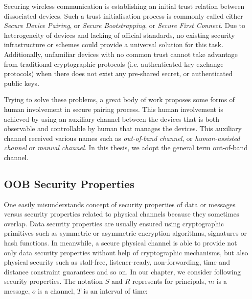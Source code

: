 Securing wireless communication is establishing an initial trust relation between dissociated devices. Such a trust initialisation process is commonly called either \textit{Secure Device Pairing}, or \textit{Secure Bootstrapping}, or \textit{Secure First Connect}. Due to heterogeneity of devices and lacking of official standards, no existing security infrastructure or schemes could provide a universal solution for this task. Additionally, unfamiliar devices with no common trust cannot take advantage from traditional cryptographic protocols (i.e. authenticated key exchange protocols) when there does not exist any pre-shared secret, or authenticated public keys.

Trying to solve these problems, a great body of work proposes some forms of human involvement in secure pairing process. This human involvement is achieved by using an auxiliary channel between the devices that is both observable and controllable by human that manages the devices. This auxiliary channel received various names such as \textit{out-of-band channel}, or \textit{human-assisted channel} or \textit{manual channel}. In this thesis, we adopt the general term out-of-band channel. 

\subsection{OOB Security Properties}

One easily misunderstands concept of security properties of data or messages versus security properties related to physical channels because they sometimes overlap. Data security properties are usually ensured using cryptographic primitives such as symmetric or asymmetric encryption algorithms, signatures or hash functions. In meanwhile, a secure physical channel is able to provide not only data security properties without help of cryptographic mechanisms, but also physical security such as stall-free, listener-ready, non-forwarding, time and distance constraint guarantees and so on. In our chapter, we consider following security properties. The notation $S$ and $R$ represents for principals, $m$ is a message, $o$ is a channel, $T$ is an interval of time:

